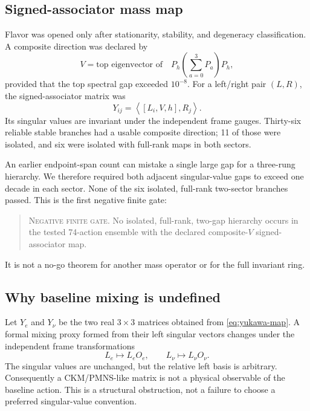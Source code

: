 \documentclass[11pt]{article}
\newcommand{\status}[1]{\textsc{#1}}
\begin{document}
\subsection{Signed-associator mass map}

Flavor was opened only after stationarity, stability, and degeneracy classification.  A composite direction was declared by
\begin{equation}
  V=\text{top eigenvector of}\quad
  P_h\left(\sum_{a=0}^{3}P_a\right)P_h,
  \label{eq:composite-v}
\end{equation}
provided that the top spectral gap exceeded $10^{-8}$.  For a left/right pair $(L,R)$, the signed-associator matrix was
\begin{equation}
  Y_{ij}=\left\langle [L_i,V,h],R_j\right\rangle.
  \label{eq:yukawa-map}
\end{equation}
Its singular values are invariant under the independent frame gauges.  Thirty-six reliable stable branches had a usable composite direction; 11 of those were isolated, and six were isolated with full-rank maps in both sectors.

An earlier endpoint-span count can mistake a single large gap for a three-rung hierarchy.  We therefore required both adjacent singular-value gaps to exceed one decade in each sector.  None of the six isolated, full-rank two-sector branches passed.  This is the first negative finite gate:
\begin{quote}
\status{Negative finite gate.} No isolated, full-rank, two-gap hierarchy occurs in the tested 74-action ensemble with the declared composite-$V$ signed-associator map.
\end{quote}
It is not a no-go theorem for another mass operator or for the full invariant ring.

\subsection{Why baseline mixing is undefined}

Let $Y_e$ and $Y_\nu$ be the two real $3\times3$ matrices obtained from \cref{eq:yukawa-map}.  A formal mixing proxy formed from their left singular vectors changes under the independent frame transformations
\begin{equation}
  L_e\mapsto L_e O_e,\qquad L_\nu\mapsto L_\nu O_\nu.
\end{equation}
The singular values are unchanged, but the relative left basis is arbitrary.  Consequently a CKM/PMNS-like matrix is not a physical observable of the baseline action.  This is a structural obstruction, not a failure to choose a preferred singular-value convention.
\end{document}
